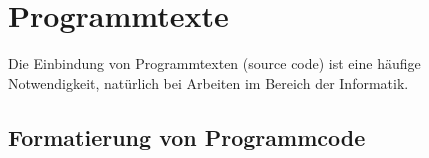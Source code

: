 


\section{Programmtexte}
\label{sec:programmtexte}

Die Einbindung von Programmtexten (source code) ist eine häufige Notwendigkeit,
\va natürlich bei Arbeiten im Bereich der Informatik.

\subsection{Formatierung von Programmcode}
\label{sec:FormatierungVonProgrammcode}

